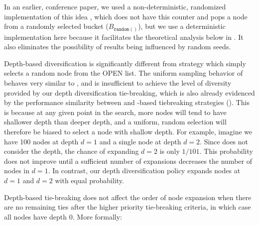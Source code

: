 In an earlier, conference paper, we used a non-deterministic,
randomized implementation of this idea \cite{Asai2016}, which does not have this counter and pops a node from a randomly selected bucket ($B_{\texttt{random}()}$), but we use a deterministic
implementation here because it facilitates the theoretical analysis below in . It also eliminates the possibility of results being influenced by random seeds.

Depth-based diversification is significantly different from \ro strategy which simply selects a random node from the OPEN list.
The uniform sampling behavior of  \ro behaves very similar to \fifo, and is insufficient to achieve the level of diversity provided by our depth diversification tie-breaking,
which is also already evidenced by the performance similarity between \fifo and \ro-based tiebreaking strategies ().
This is because at any given point in the search, more nodes will tend to have shallower depth than deeper depth, and a uniform, random selection will therefore be biased to select a node with shallow depth.
For example, imagine we have 100 nodes at depth $d=1$ and a single node at depth $d=2$.
Since \ro does not consider the depth, the chance of expanding $d=2$ is only $1/101$.
This probability does not improve until a sufficient number of expansions decreases the number of nodes in $d=1$.
In contrast, our depth diversification policy expands nodes at $d=1$ and $d=2$ with equal probability.




Depth-based tie-breaking does not affect the order of node expansion when there are no remaining ties after the
higher priority tie-breaking criteria, in which case all nodes have depth 0.
More formally:

